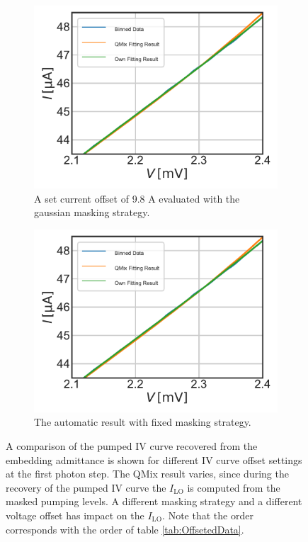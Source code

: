 \documentclass[]{article}
\begin{document}
\begin{figure}
\begin{subfigure}[t]{0.49\textwidth}
	\end{subfigure}
	\begin{subfigure}[t]{0.49\textwidth}
		\centering
		\includegraphics[width=\linewidth]{./../Mixer_Unit_Test/2020_01_14_IVOffset_9.8uA_iLOfix/Comparison_with_Johns_Embedding_Impedance.pdf}
		\caption{A set current offset of 9.8 \textmu A evaluated with the gaussian masking strategy.}
	\end{subfigure}
	\begin{subfigure}[t]{0.49\textwidth}
		\centering
		\includegraphics[width=\linewidth]{./../Mixer_Unit_Test/2020_01_16_IVOffsetGausMask_9.8uA/Comparison_with_Johns_Embedding_Impedance.pdf}
		\caption{The automatic result with fixed masking strategy.}
	\end{subfigure}
	\caption[]{A comparison of the pumped IV curve recovered from the embedding admittance is shown for different IV curve offset settings at the first photon step. The QMix result varies, since during the recovery of the pumped IV curve the $I_\text{LO}$ is computed from the masked pumping levels. A different masking strategy and a different voltage offset has impact on the $I_\text{LO}$. Note that the order corresponds with the order of table \ref{tab:OffsetedData}.
	}
	\label{fig:Offseted_PumpedIVcurve}
\end{figure}
\end{document}
